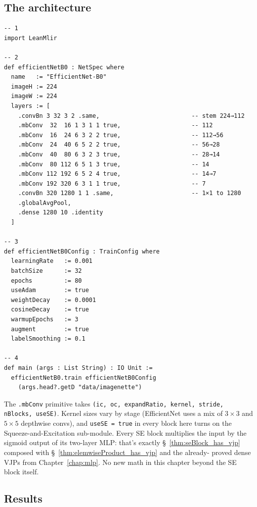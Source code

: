 \subsection*{The architecture}

\begin{verbatim}
-- 1
import LeanMlir

-- 2
def efficientNetB0 : NetSpec where
  name   := "EfficientNet-B0"
  imageH := 224
  imageW := 224
  layers := [
    .convBn 3 32 3 2 .same,                          -- stem 224→112
    .mbConv  32  16 1 3 1 1 true,                    -- 112
    .mbConv  16  24 6 3 2 2 true,                    -- 112→56
    .mbConv  24  40 6 5 2 2 true,                    -- 56→28
    .mbConv  40  80 6 3 2 3 true,                    -- 28→14
    .mbConv  80 112 6 5 1 3 true,                    -- 14
    .mbConv 112 192 6 5 2 4 true,                    -- 14→7
    .mbConv 192 320 6 3 1 1 true,                    -- 7
    .convBn 320 1280 1 1 .same,                      -- 1×1 to 1280
    .globalAvgPool,
    .dense 1280 10 .identity
  ]

-- 3
def efficientNetB0Config : TrainConfig where
  learningRate   := 0.001
  batchSize      := 32
  epochs         := 80
  useAdam        := true
  weightDecay    := 0.0001
  cosineDecay    := true
  warmupEpochs   := 3
  augment        := true
  labelSmoothing := 0.1

-- 4
def main (args : List String) : IO Unit :=
  efficientNetB0.train efficientNetB0Config
    (args.head?.getD "data/imagenette")
\end{verbatim}

The \texttt{.mbConv} primitive takes
\texttt{(ic, oc, expandRatio, kernel, stride, nBlocks, useSE)}.
Kernel sizes vary by stage (EfficientNet uses a mix of
$3 \times 3$ and $5 \times 5$ depthwise convs), and \texttt{useSE
= true} in every block here turns on the Squeeze-and-Excitation
sub-module. Every SE block multiplies the input by the sigmoid
output of its two-layer MLP: that's exactly \S~\ref{thm:seBlock_has_vjp}
composed with \S~\ref{thm:elemwiseProduct_has_vjp} and the already-
proved dense VJPs from Chapter~\ref{chap:mlp}. No new math in this
chapter beyond the SE block itself.

\subsection*{Results}

